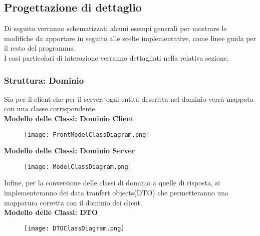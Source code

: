 \newpage
\subsection{Progettazione di dettaglio}

Di seguito verranno schematizzati alcuni esempi generali per mostrare le modifiche da apportare in seguito alle scelte implementative, come linee guida per il resto del programma.\\
I casi particolari di interazione verranno dettagliati nella relativa sezione.
\subsubsection{Struttura: Dominio}
Sia per il client che per il server, ogni entità descritta nel dominio verrà mappata con una classe corrispondente.\\
\textbf{Modello delle Classi: Dominio Client}\\
\begin{figure}[h!]
    \begin{center}
        \texttt{[image: FrontModelClassDiagram.png]}
    \end{center}
\end{figure}
\clearpage

\textbf{Modello delle Classi: Dominio Server}\\
\begin{figure}[h!]
    \begin{center}
        \texttt{[image: ModelClassDiagram.png]}
    \end{center}
\end{figure}
\clearpage

Infine, per la conversione delle classi di dominio a quelle di risposta, si implementeranno dei data tranfert objects(DTO) che permetteranno una mappatura corretta con il dominio dei client.\\
\textbf{Modello delle Classi: DTO}\\
\begin{figure}[h!]
    \begin{center}
        \texttt{[image: DTOClassDiagram.png]}
    \end{center}
\end{figure}
\clearpage

\clearpage

